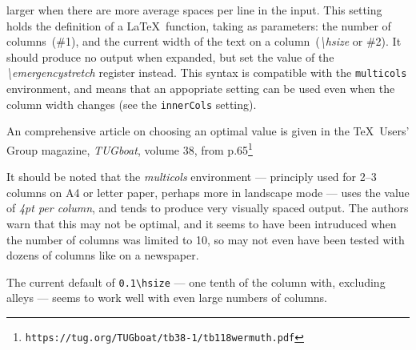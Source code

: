 \documentclass[a4paper,DIV=11]{scrartcl}
\begin{document}
\begin{multicols}{2}
{  larger when there are more average spaces per line in the input.
  This setting holds the definition of a \LaTeX\ function, taking as
  parameters: the number of columns~(\#1), and the current width of
  the text on a column~(\textit{\textbackslash hsize} or \#2). It
  should produce no output when expanded, but set the value of the
  \textit{\textbackslash emergencystretch} register instead. This
  syntax is compatible with the \texttt{multicols} environment, and
  means that an appopriate setting can be used even when the column
  width changes (see the \texttt{innerCols} setting).\par
  An comprehensive article on choosing an optimal value is given in the
  \TeX\ Users' Group magazine, \textit{TUGboat}, volume 38, from p.65\footnote{
  \texttt{https://tug.org/TUGboat/tb38-1/tb118wermuth.pdf}} \par
  It should be noted that the \textit{multicols} environment ---
  principly used for 2--3 columns on A4 or letter paper, perhaps more
  in landscape mode --- uses the value of \textit{4pt per column}, and
  tends to produce very visually spaced output. The authors warn that
  this may not be optimal, and it seems to have been intruduced when
  the number of columns was limited to 10, so may not even have been
  tested with dozens of columns like on a newspaper.
  \par
  The current default of \texttt{0.1\textbackslash hsize} --- one
  tenth of the column with, excluding alleys --- seems to
  work well with even large numbers of columns.
}
\end{multicols}
\end{document}
